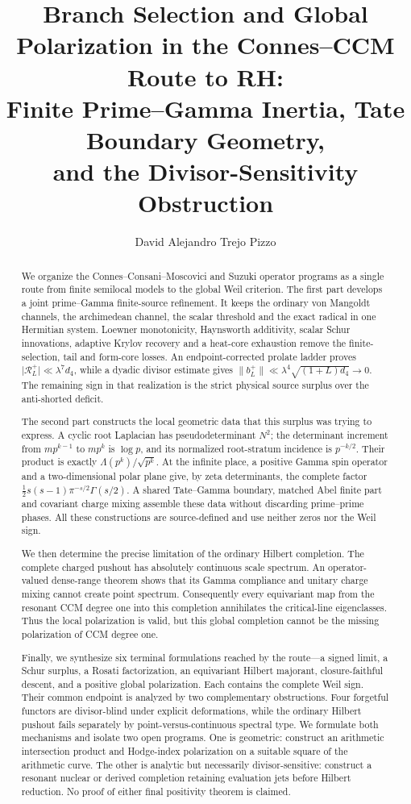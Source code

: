 \documentclass[11pt]{amsart}
\title[Branch selection and global polarization]
{Branch Selection and Global Polarization in the Connes--CCM Route to RH:\\
Finite Prime--Gamma Inertia, Tate Boundary Geometry,\\
and the Divisor-Sensitivity Obstruction}
\author{David Alejandro Trejo Pizzo}
\theoremstyle{definition}
\theoremstyle{remark}
\begin{document}
\begin{abstract}
We organize the Connes--Consani--Moscovici and Suzuki operator programs as
a single route from finite semilocal models to the global Weil criterion.
The first part develops a joint prime--Gamma finite-source refinement.  It
keeps the ordinary von Mangoldt channels, the archimedean channel, the
scalar threshold and the exact radical in one Hermitian system.  Loewner
monotonicity, Haynsworth additivity, scalar Schur innovations, adaptive
Krylov recovery and a heat-core exhaustion remove the finite-selection,
tail and form-core losses.  An endpoint-corrected prolate ladder proves
\(\lvert\mathscr R_L^+\rvert\ll\lambda^7d_4\), while a dyadic divisor
estimate gives
\(\|b_L^+\|\ll\lambda^4\sqrt{(1+L)d_4}\to0\).  The remaining sign in
that realization is the strict physical source surplus over the
anti-shorted deficit.

The second part constructs the local geometric data that this surplus was
trying to express.  A cyclic root Laplacian has pseudodeterminant \(N^2\);
the determinant increment from \(mp^{k-1}\) to \(mp^k\) is \(\log p\),
and its normalized root-stratum incidence is \(p^{-k/2}\).  Their product
is exactly \(\Lambda(p^k)/\sqrt{p^k}\).  At the infinite place, a positive
Gamma spin operator and a two-dimensional polar plane give, by zeta
determinants, the complete factor
\(\frac12s(s-1)\pi^{-s/2}\Gamma(s/2)\).  A shared Tate--Gamma boundary,
matched Abel finite part and covariant charge mixing assemble these data
without discarding prime--prime phases.  All these constructions are
source-defined and use neither zeros nor the Weil sign.

We then determine the precise limitation of the ordinary Hilbert
completion.  The complete charged pushout has absolutely continuous scale
spectrum.  An operator-valued dense-range theorem shows that its Gamma
compliance and unitary charge mixing cannot create point spectrum.
Consequently every equivariant map from the resonant CCM degree one into
this completion annihilates the critical-line eigenclasses.  Thus the
local polarization is valid, but this global completion cannot be the
missing polarization of CCM degree one.

Finally, we synthesize six terminal formulations reached by the route---a
signed limit, a Schur surplus, a Rosati factorization, an equivariant
Hilbert majorant, closure-faithful descent, and a positive global
polarization.  Each contains the complete Weil sign.  Their common
endpoint is analyzed by two complementary obstructions.  Four forgetful
functors are divisor-blind under explicit deformations, while the ordinary
Hilbert pushout fails separately by point-versus-continuous spectral type.
We formulate both mechanisms and isolate two open programs.  One
is geometric: construct an arithmetic intersection product and Hodge-index
polarization on a suitable square of the arithmetic curve.  The other is
analytic but necessarily divisor-sensitive: construct a resonant nuclear
or derived completion retaining evaluation jets before Hilbert reduction.
No proof of either final positivity theorem is claimed.
\end{abstract}
\end{document}
